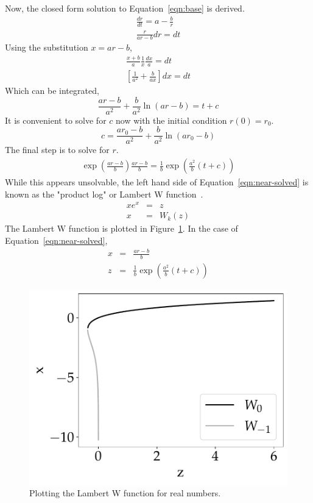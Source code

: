 \documentclass[journal]{IEEEtran}
\begin{document}
Now, the closed form solution to Equation~\ref{eqn:base} is derived.
\begin{eqnarray}
  \frac{dr}{dt} = a - \frac{b}{r} \\
  \frac{r}{ar - b} dr = dt
\end{eqnarray}
Using the substitution $x = ar-b$,
\begin{eqnarray}
  \frac{x+b}{a}\frac{1}{x} \frac{dx}{a} = dt \\
  \left[\frac{1}{a^2} + \frac{b}{ax}\right] dx = dt
\end{eqnarray}
Which can be integrated,
\begin{equation}
  \frac{ar-b}{a^2} + \frac{b}{a^2}\ln\left(ar-b\right) = t + c
\end{equation}
It is convenient to solve for $c$ now with the initial condition $r(0) = r_0$.
\begin{equation}
  c = \frac{ar_0-b}{a^2} + \frac{b}{a^2}\ln\left(ar_0 - b\right)
\end{equation}
The final step is to solve for $r$.
\begin{eqnarray}
  \label{eqn:near-solved}
  \exp\left( \frac{ar-b}{b}\right) \frac{ar-b}{b} = \frac{1}{b}\exp\left(\frac{a^2}{b}(t+c)\right)
\end{eqnarray}
While this appears unsolvable, the left hand side of Equation~\ref{eqn:near-solved} is known as the "product log" or Lambert W function~\cite{lambert1758observationes,weisstein2002lambert}.
\begin{eqnarray}
  xe^x &=& z \\
  x &=& W_k(z)
\end{eqnarray}
The Lambert W function is plotted in Figure~\ref{fig:w}.
In the case of Equation~\ref{eqn:near-solved},
\begin{eqnarray}
  \label{eqn:x}
  x &=& \frac{ar-b}{b} \\
  z &=& \frac{1}{b} \exp\left(\frac{a^2}{b}(t+c)\right)
\end{eqnarray}

\begin{figure}[b]
  \centering
    \includegraphics[width=0.9\linewidth]{w}%
  \caption{Plotting the Lambert W function for real numbers.}
  \label{fig:w}
\end{figure}
\end{document}

